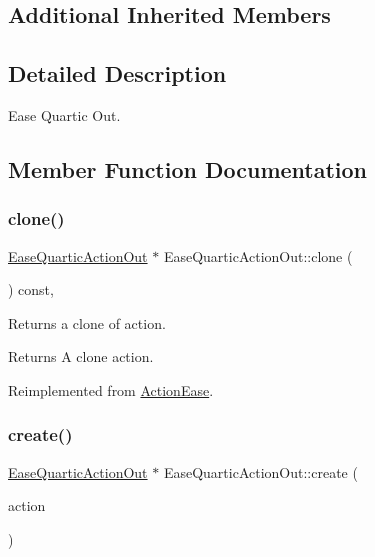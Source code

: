 \subsection*{Additional Inherited Members}


\subsection{Detailed Description}
Ease Quartic Out. 

\subsection{Member Function Documentation}
\mbox{\label{classEaseQuarticActionOut_a0d29354269fc9a975fe64ff915bced49}} 
\subsubsection{\texorpdfstring{clone()}{clone()}}
{\footnotesize\ttfamily \hyperlink{classEaseQuarticActionOut}{Ease\+Quartic\+Action\+Out} $\ast$ Ease\+Quartic\+Action\+Out\+::clone (\begin{DoxyParamCaption}\item[{void}]{ }\end{DoxyParamCaption}) const\hspace{0.3cm}{\ttfamily [override]}, {\ttfamily [virtual]}}

Returns a clone of action.

\begin{DoxyReturn}{Returns}
A clone action. 
\end{DoxyReturn}


Reimplemented from \hyperlink{classActionEase_a39bec93fe161fb732a74d8e51a2fe08b}{Action\+Ease}.

\mbox{\label{classEaseQuarticActionOut_a9ac4e42e6cf887aeb1f2d29ec386d288}} 
\subsubsection{\texorpdfstring{create()}{create()}}
{\footnotesize\ttfamily \hyperlink{classEaseQuarticActionOut}{Ease\+Quartic\+Action\+Out} $\ast$ Ease\+Quartic\+Action\+Out\+::create (\begin{DoxyParamCaption}\item[{\hyperlink{classActionInterval}{Action\+Interval} $\ast$}]{action }\end{DoxyParamCaption})\hspace{0.3cm}{\ttfamily [static]}}



